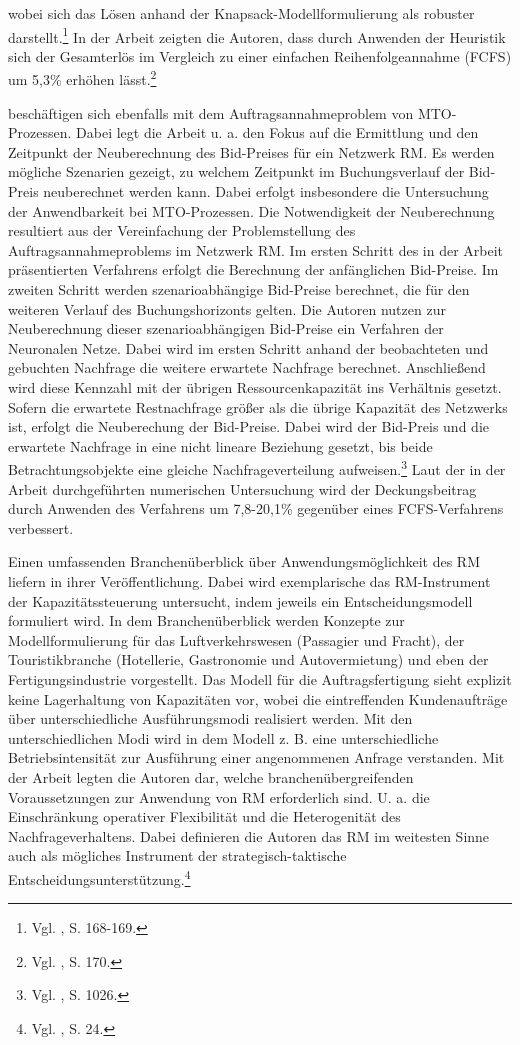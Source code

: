 wobei sich das Lösen anhand der Knapsack-Modell\-for\-mu\-lier\-ung als robuster darstellt.\footnote{Vgl. \cite{Spengler:2007aa}, S. 168-169.} In der Arbeit zeigten die Autoren, dass durch Anwenden der Heuristik sich der Gesamterlös im Vergleich zu einer einfachen Reihenfolgeannahme (FCFS) um 5,3\% erhöhen lässt.\footnote{Vgl. \cite{Spengler:2007aa}, S. 170.}

\cite{Volling20121021} beschäftigen sich ebenfalls mit dem Auftragsannahmeproblem von MTO-Prozessen. Dabei legt die Arbeit u. a. den Fokus auf die Ermittlung und den Zeitpunkt der Neuberechnung des Bid-Preises für ein Netzwerk RM. Es werden mögliche Szenarien gezeigt, zu welchem Zeitpunkt im Buchungsverlauf der Bid-Preis neuberechnet werden kann. Dabei erfolgt insbesondere die Untersuchung der Anwendbarkeit bei MTO-Prozessen. Die Notwendigkeit der Neuberechnung resultiert aus der Vereinfachung der Problemstellung des Auftragsannahmeproblems im Netzwerk RM. Im ersten Schritt des in der Arbeit präsentierten Verfahrens erfolgt die Berechnung der anfänglichen Bid-Preise. Im zweiten Schritt werden szenarioabhängige Bid-Preise berechnet, die für den weiteren Verlauf des Buchungshorizonts gelten. Die Autoren nutzen zur Neuberechnung dieser szenarioabhängigen Bid-Preise ein Verfahren der \glqq Neuronalen Netze{\grqq}. Dabei wird im ersten Schritt anhand der beobachteten und gebuchten Nachfrage die weitere erwartete Nachfrage berechnet. Anschließend wird diese Kennzahl mit der übrigen Ressourcenkapazität ins Verhältnis gesetzt. Sofern die erwartete Restnachfrage größer als die übrige Kapazität des Netzwerks ist, erfolgt die Neuberechung der Bid-Preise. Dabei wird der Bid-Preis und die erwartete Nachfrage in eine nicht lineare Beziehung gesetzt, bis beide Betrachtungsobjekte eine gleiche Nachfrageverteilung aufweisen.\footnote{Vgl. \cite{Volling20121021}, S. 1026.} Laut der in der Arbeit durchgeführten numerischen Untersuchung wird der Deckungsbeitrag durch Anwenden des Verfahrens um 7,8-20,1\% gegenüber eines FCFS-Verfahrens verbessert.

Einen umfassenden Branchenüberblick über Anwendungsmöglichkeit des RM liefern \cite{kimms2005branchenverg} in ihrer Veröffentlichung. Dabei wird exemplarische das RM-Instrument der Kapazitätssteuerung untersucht, indem jeweils ein Entscheidungsmodell formuliert wird. In dem Branchenüberblick werden Konzepte zur Modellformulierung für das Luftverkehrswesen (Passagier und Fracht), der Touristikbranche (Hotellerie, Gastronomie und Autovermietung) und eben der Fertigungsindustrie vorgestellt. Das Modell für die Auftragsfertigung sieht explizit keine Lagerhaltung von Kapazitäten vor, wobei die eintreffenden Kundenaufträge über unterschiedliche Ausführungsmodi realisiert werden. Mit den unterschiedlichen Modi wird in dem Modell z. B. eine unterschiedliche Betriebsintensität zur Ausführung einer angenommenen Anfrage verstanden. Mit der Arbeit legten die Autoren dar, welche branchenübergreifenden Voraussetzungen zur Anwendung von RM erforderlich sind. U. a. die Einschränkung operativer Flexibilität und die Heterogenität des Nachfrageverhaltens. Dabei definieren die Autoren das RM im weitesten Sinne auch als mögliches Instrument der strategisch-taktische Entscheidungsunterstützung.\footnote{Vgl. \cite{kimms2005branchenverg}, S. 24.} 

